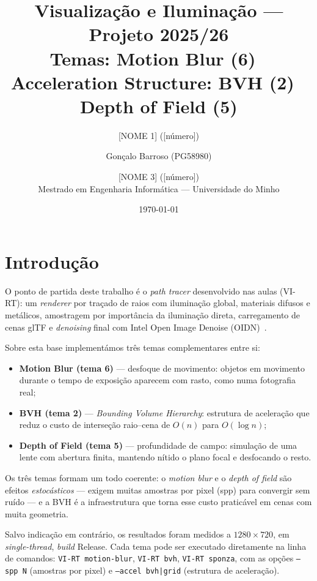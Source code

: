 \documentclass[11pt,a4paper]{article}
\title{\textbf{Visualização e Iluminação --- Projeto 2025/26}\\[0.5em]
\large Temas: Motion Blur (6) \,\textperiodcentered\, Acceleration Structure: BVH (2) \,\textperiodcentered\, Depth of Field (5)}
\author{[NOME 1] ([número]) \and Gonçalo Barroso (PG58980) \and [NOME 3] ([número])\\[0.3em]
\small Mestrado em Engenharia Informática --- Universidade do Minho}
\date{\today}
\begin{document}
\maketitle

\section{Introdução}

O ponto de partida deste trabalho é o \emph{path tracer} desenvolvido nas aulas (VI-RT): um \emph{renderer} por traçado de raios com iluminação global, materiais difusos e metálicos, amostragem por importância da iluminação direta, carregamento de cenas glTF e \emph{denoising} final com Intel Open Image Denoise (OIDN)~\cite{oidn}.

Sobre esta base implementámos três temas complementares entre si:

\begin{itemize}
  \item \textbf{Motion Blur (tema 6)} --- desfoque de movimento: objetos em movimento durante o tempo de exposição aparecem com rasto, como numa fotografia real;
  \item \textbf{BVH (tema 2)} --- \emph{Bounding Volume Hierarchy}: estrutura de aceleração que reduz o custo de interseção raio--cena de $O(n)$ para $O(\log n)$;
  \item \textbf{Depth of Field (tema 5)} --- profundidade de campo: simulação de uma lente com abertura finita, mantendo nítido o plano focal e desfocando o resto.
\end{itemize}

Os três temas formam um todo coerente: o \emph{motion blur} e o \emph{depth of field} são efeitos \emph{estocásticos} --- exigem muitas amostras por pixel (spp) para convergir sem ruído --- e a BVH é a infraestrutura que torna esse custo praticável em cenas com muita geometria.

Salvo indicação em contrário, os resultados foram medidos a $1280\times720$, em \emph{single-thread}, \emph{build} Release. Cada tema pode ser executado diretamente na linha de comandos: \texttt{VI-RT motion-blur}, \texttt{VI-RT bvh}, \texttt{VI-RT sponza}, com as opções \texttt{--spp N} (amostras por pixel) e \texttt{--accel bvh|grid} (estrutura de aceleração).

\end{document}
